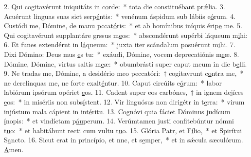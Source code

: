 2. Qui cogitavérunt iniquitáts in c\uline{o}rde:~* tota die constituébant pr\uline{ǽ}lia.
3. Acuérunt linguas suas sict serp\uline{é}ntis:~* venénum áspidum sub lábiis e\uline{ó}rum.
4. Custódi me, Dómine, de manu pccat\uline{ó}ris:~* et ab homínibus iníquis érip\uline{e} me.
5. Qui cogitavérunt supplantáre grssus m\uline{e}os:~* abscondérunt supérbi láqueum m\uline{i}hi:
6. Et funes extendérnt in l\uline{á}queum:~* juxta iter scándalum posuérunt m\uline{i}hi.
7. Dixi Dómino: Deus mus \uline{e}s tu:~* exáudi, Dómine, vocem deprecatiónis m\uline{e}æ.
8. Dómine, Dómine, virtus saltis m\uline{e}æ:~* obumbrásti super caput meum in die b\uline{e}lli.
9. Ne tradas me, Dómine, a desidério meo peccatóri:~† cogitavrunt c\uline{o}ntra me,~* ne derelínquas me, ne forte exalt\uline{é}ntur.
10. Caput circúits e\uline{ó}rum:~* labor labiórum ipsórum opériet \uline{e}os.
11. Cadent super eos carbónes,~† in ignem dejíces \uline{e}os:~* in misériis non subs\uline{í}stent.
12. Vir linguósus non dirigétr in t\uline{e}rra:~* virum injústum mala cápient in int\uline{é}ritu.
13. Cognóvi quia fáciet Dóminus judícum \uline{í}nopis:~* et vindíctam p\uline{áu}perum.
14. Verúmtamen justi confitebúntur nómni t\uline{u}o:~* et habitábunt recti cum vultu t\uline{u}o.
15. Glória Patr, et F\uline{í}lio,~* et Spirítui S\uline{a}ncto.
16. Sicut erat in princípio, et nnc, et s\uline{e}mper,~* et in sǽcula sæculórum. \uline{A}men.
